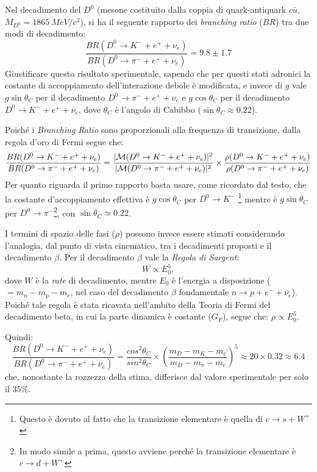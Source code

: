 \begin{Exercise}[title={Legge di Sargent}]
 Nel decadimento del $D^0$ (mesone costituito dalla coppia di
 quark-antiquark $c\bar{u}$, $M_{D^0}=\SI{1865}{MeV/c^2}$), si ha il
 seguente rapporto dei \textit{branching ratio} ($BR$) tra due modi di
 decadimento:
 \[
 \frac{BR(D^0 \to K^- + e^+ + \nu_e)}{BR(D^0 \to \pi^- + e^+ + \nu_e)} = 9.8 \pm 1.7
 \]
 Giustificare questo risultato sperimentale, sapendo che per questi
 stati adronici la costante di accoppiamento dell'interazione debole
 \`e modificata, e invece di $g$ vale $g\sin\theta_C$ per il
 decadimento $D^0\to\pi^- + e^+ + \nu_e$ e $g\cos\theta_C$ per il
 decadimento $D^0 \to K^- + e^+ + \nu_e$, dove $\theta_C$ \`e l'angolo
 di Cabibbo ($\sin\theta_C \approx 0.22$).
\end{Exercise}

\begin{Answer}
  Poich\'e i \textit{Branching Ratio} sono
  proporzionali alla frequenza di transizione, dalla regola d'oro di Fermi segue
  che:
  \[
  \frac{BR(D^0 \to K^- + e^+ + \nu_e)}{BR(D^0 \to \pi^- + e^+ + \nu_e)} =
  \frac{|{\cal M}(D^0 \to K^- + e^+ + \nu_e)|^2}{|{\cal M}(D^0 \to \pi^- + e^+ + \nu_e)|^2} \times
  \frac{\rho(D^0 \to K^- + e^+ + \nu_e)}{\rho(D^0 \to \pi^- + e^+ + \nu_e)}
  \]
  Per quanto riguarda il primo rapporto basta usare, come ricordato dal
  testo, che la costante d'accoppiamento effettiva \`e $g \cos \theta_C$
  per $D^0 \to K^-$ \footnote{Questo \`e dovuto al fatto che la
  transizione elementare \`e quella di $c \to s + W^+$} mentre \`e $g
  \sin \theta_C$ per $D^0 \to \pi^-$\footnote{In modo simile a prima,
  questo avviene perch\'e la transizione elementare \`e $c \to d +
  W^+$}, con $\sin \theta_C \simeq 0.22$.
  
  I termini di spazio delle fasi ($\rho$) possono invece essere stimati 
  considerando l'analogia, dal punto di vista cinematico, tra i decadimenti
  proposti e il decadimento $\beta$. Per il decadimento $\beta$ vale la {\it Regola di
    Sargent}:
  \[
  W \propto E_0^5,
  \]
  dove $W$ \`e la \textit{rate} di decadimento, mentre
  $E_0$ \`e l'energia a disposizione ($= m_n - m_p - m_e$, nel caso del 
  decadimento $\beta$ fondamentale $n \to p + e^- + \bar{\nu_e}$).  Poich\'e tale
  regola \`e stata ricavata nell'ambito della Teoria di Fermi del decadimento
  beta, in cui la parte dinamica \`e costante ($G_F$), segue che: 
  $\rho \propto E_0^5$.

  Quindi:
  \[\frac{BR(D^0 \to K^- + e^+ + \nu_e)}{BR(D^0 \to \pi^- + e^+ + \nu_e)} =
  \frac{cos^2 \theta_C}{sin ^2 \theta_C} \times 
  \left ( \frac {m_D - m_K - m_e}{m_D - m_\pi - m_e} \right )^5 \approx
  20 \times 0.32 \approx 6.4
  \]
  che, nonostante la rozzezza della stima, differisce dal valore sperimentale per solo il 35\%.
\end{Answer}


